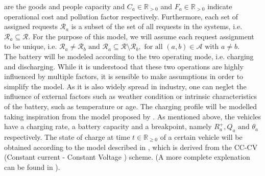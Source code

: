 are the goods and people capacity and $C_a \in \mathbb{R}_{>0}$ and $F_a \in \mathbb{R}_{>0}$ indicate operational cost and pollution factor respectively. Furthermore, each set of assigned requests $\mathcal{R}_a$ is a subset of the set of all requests in the systems, i.e. $\mathcal{R}_a \subseteq\mathcal{R}$. For the purpose of this model, we will assume each request assignment to be unique, i.e. $\mathcal{R}_a \neq \mathcal{R}_b \text{ and } \mathcal{R}_a \subseteq \mathcal{R} \setminus \mathcal{R}_b,  \text{ for all } (a,b) \in \mathcal{A} \text{ with } a\neq b$. \\
The battery will be modeled according to the two operating mode, i.e. charging and discharging. While it is understood that these two operations are highly influenced by multiple factors, it is sensible to make assumptions in order to simplify the model. 
As it is also widely spread in industry, one can neglet the influence of external factors such as weather condition or intrinsic characteristics of the battery, such as temperature or age. The charging profile will be modelled taking inspiration from the model proposed by . As mentioned above, the vehicles have a charging rate, a battery capacity and a breakpoint, namely $R^+_a, Q_a \text{ and } \theta_a$ respectively. The state of charge at time $t \in \mathbb{R}_{\ge0}$ of a certain vehicle will be obtained according to the model described in , which is derived from the CC-CV (Constant current - Constant Voltage ) scheme. (A more complete explenation can be found in \cite{LIU2020101342}).%

